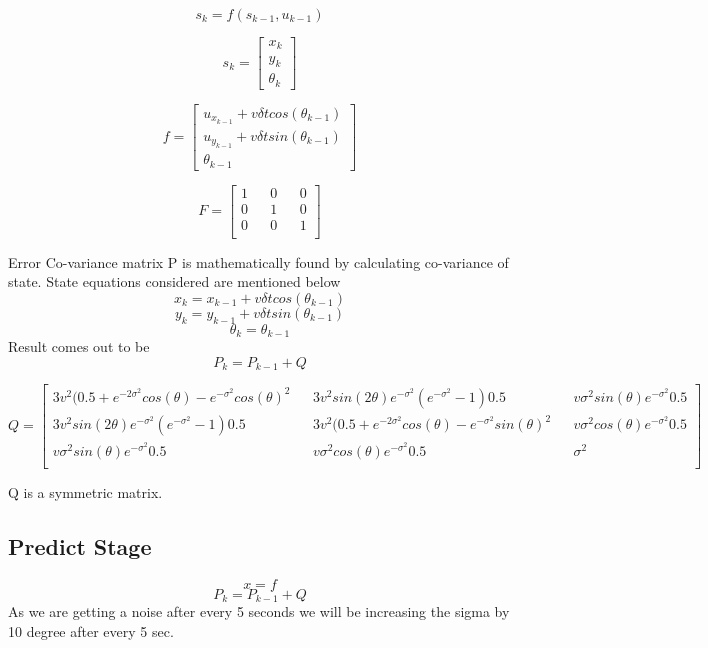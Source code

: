 \documentclass[12pt]{article}
\begin{document}
\[ s_k = f(s_{k-1}, u_{k-1})\] 

\[
s_k=
  \begin{bmatrix}
    x_k \\
    y_k \\
    \theta_k
  \end{bmatrix}
\]

\[
f=
  \begin{bmatrix}
    u_x_{k-1} + v\delta t cos(\theta_{k-1})\\
    u_y_{k-1} + v\delta t sin(\theta_{k-1}) \\
    \theta_{k-1}
  \end{bmatrix}
\]

\[
F=
  \begin{bmatrix}
    1 && 0 && 0\\
    0 && 1 && 0\\
    0 && 0 && 1\\
  \end{bmatrix}
\]



Error Co-variance matrix P is mathematically found by calculating co-variance of state.
State equations considered are mentioned below
 \[
 x_{k} =  x_{k-1} + v\delta t cos(\theta_{k-1})\]
 \[y_{k} =  y_{k-1} + v\delta t sin(\theta_{k-1})\] 
 \[\theta_{k} =   \theta_{k-1}\]
Result comes out to be
\[ P_{k} = P_{k-1} + Q\]
 
\[
Q =
  \begin{bmatrix}
    3v^2(0.5 + e^{-2\sigma^2}cos(\theta) - e^{-\sigma^2}cos(\theta)^2 && 3v^2sin(2\theta)e^{-\sigma^2}(e^{-\sigma^2} - 1)0.5 && v\sigma^2 sin(\theta) e^{-\sigma^2}0.5\\
    3v^2sin(2\theta)e^{-\sigma^2}(e^{-\sigma^2} - 1)0.5 && 3v^2(0.5 + e^{-2\sigma^2}cos(\theta) - e^{-\sigma^2}sin(\theta)^2 &&  v\sigma^2 cos(\theta) e^{-\sigma^2}0.5\\
    v\sigma^2 sin(\theta) e^{-\sigma^2}0.5 &&  v\sigma^2 cos(\theta) e^{-\sigma^2}0.5 && \sigma^2\\
  \end{bmatrix}
\]

Q is a symmetric matrix.\\

\subsection{Predict Stage}
\[ x = f\]
\[ P_{k} = P_{k-1} + Q\]
As we are getting a noise after every 5 seconds we will be increasing the sigma by 10 degree after every 5 sec.\\
\end{document}
